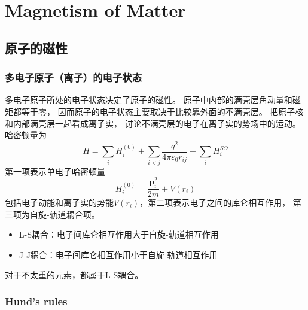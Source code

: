 \section{Magnetism of Matter}

\subsection{原子的磁性}

\subsubsection{多电子原子（离子）的电子状态}

多电子原子所处的电子状态决定了原子的磁性。
原子中内部的满壳层角动量和磁矩都等于零，
因而原子的电子状态主要取决于比较靠外面的不满壳层。
把原子核和内部满壳层一起看成离子实，
讨论不满壳层的电子在离子实的势场中的运动。
哈密顿量为
$$
H=\sum_{i} H_{i}^{(0)}+\sum_{i<j} \frac{q^{2}}{4 \pi \varepsilon_{0} r_{i j}}+\sum_{i} H_{i}^{S O}
$$
第一项表示单电子哈密顿量
$$
H_{i}^{(0)}=\frac{\bm{p}_{i}^{2}}{2 m}+V(r_{i})
$$
包括电子动能和离子实的势能$V(r_{i})$，第二项表示电子之间的库仑相互作用，
第三项为自旋-轨道耦合项。

\begin{itemize}
    \item L-S耦合：电子间库仑相互作用大于自旋-轨道相互作用
    \item J-J耦合：电子间库仑相互作用小于自旋-轨道相互作用
\end{itemize}
对于不太重的元素，都属于L-S耦合。

\subsubsection{Hund's rules}
